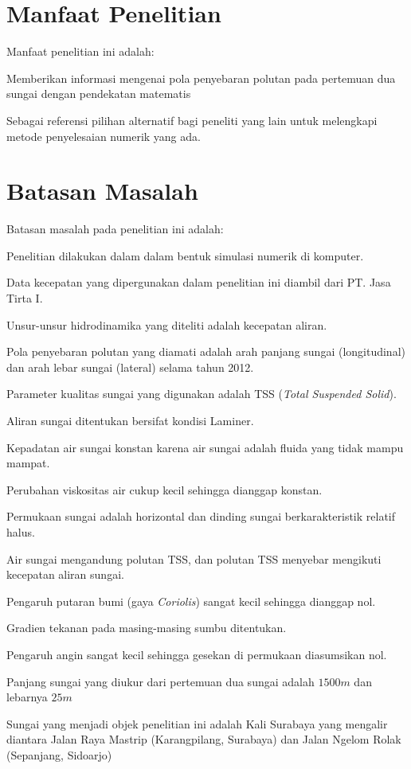 \section{Manfaat Penelitian}
Manfaat penelitian ini adalah:
\begin{tenumerate}
	\item Memberikan informasi mengenai pola penyebaran polutan pada pertemuan dua sungai dengan pendekatan matematis
	\item Sebagai referensi pilihan alternatif bagi peneliti yang lain untuk melengkapi metode penyelesaian numerik yang ada.
\end{tenumerate}

\section{Batasan Masalah}
Batasan masalah pada penelitian ini adalah:
\begin{tenumerate}
	\item Penelitian dilakukan dalam dalam bentuk simulasi numerik di komputer.
	\item Data kecepatan yang dipergunakan dalam penelitian ini diambil dari PT. Jasa Tirta I.
	\item Unsur-unsur hidrodinamika yang diteliti adalah kecepatan aliran.
	\item Pola penyebaran polutan yang diamati adalah arah panjang sungai (longitudinal) dan arah lebar sungai (lateral) selama tahun 2012.
	\item Parameter kualitas sungai yang digunakan adalah TSS (\textit{Total Suspended Solid}).
	\item Aliran sungai ditentukan bersifat kondisi Laminer.
	\item Kepadatan air sungai konstan karena air sungai adalah fluida yang tidak mampu mampat.
	\item Perubahan viskositas air cukup kecil sehingga dianggap konstan.
	\item Permukaan sungai adalah horizontal dan dinding sungai berkarakteristik relatif halus.
	\item Air sungai mengandung polutan TSS, dan polutan TSS menyebar mengikuti kecepatan aliran sungai.
	\item Pengaruh putaran bumi (gaya \textit{Coriolis}) sangat kecil sehingga dianggap nol.
	\item Gradien tekanan pada masing-masing sumbu ditentukan.
	\item Pengaruh angin sangat kecil sehingga gesekan di permukaan diasumsikan nol.
	\item Panjang sungai yang diukur dari pertemuan dua sungai adalah $1500m$ dan lebarnya $25m$
	\item Sungai yang menjadi objek penelitian ini adalah Kali Surabaya yang mengalir diantara Jalan Raya Mastrip (Karangpilang, Surabaya) dan Jalan Ngelom Rolak (Sepanjang, Sidoarjo)
\end{tenumerate}

